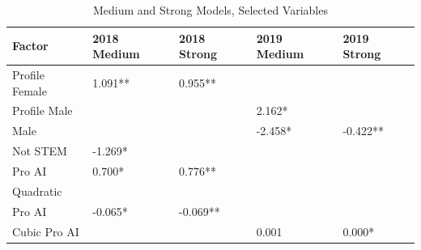 \documentclass[AER]{./aea-latex-templates/AEA}
\begin{document}
        \begin{table}
            \caption{Medium and Strong Models, Selected Variables}
            \begin{tabular}{lllll}
            Factor & 2018 Medium & 2018 Strong & 2019 Medium & 2019 Strong \\
            \toprule
            Profile Female & 1.091** & 0.955** \\ %
            Profile Male &  &  & 2.162* &  \\ %
            Male &  &  & -2.458* & -0.422** \\
            Not STEM & -1.269* \\ %
            Pro AI & 0.700* & 0.776** \\ %
            Quadratic
            \\Pro AI & -0.065* & -0.069** \\ %
            Cubic Pro AI &  &  & 0.001 & 0.000* \\ %

\end{tabular}
\end{table}
\end{document}
